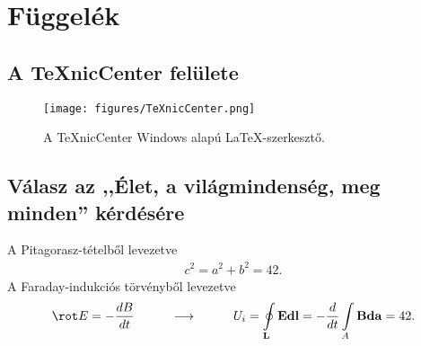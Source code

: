 \appendix
\chapter*{Függelék}
\setcounter{chapter}{6}  %
\setcounter{equation}{0} %

\section{A TeXnicCenter felülete}
\begin{figure}[!ht]
\centering
\texttt{[image: figures/TeXnicCenter.png]}
\caption{A TeXnicCenter Windows alapú \LaTeX-szerkesztő.} 
\end{figure}

\clearpage\section{Válasz az ,,Élet, a világmindenség, meg minden'' kérdésére}
A Pitagorasz-tételből levezetve
\begin{align}
c^2=a^2+b^2=42.
\end{align}
A Faraday-indukciós törvényből levezetve
\begin{align}
\rot E=-\frac{dB}{dt}\hspace{1cm}\longrightarrow \hspace{1cm}
U_i=\oint\limits_\mathbf{L}{\mathbf{E}\mathbf{dl}}=-\frac{d}{dt}\int\limits_A{\mathbf{B}\mathbf{da}}=42.
\end{align}





